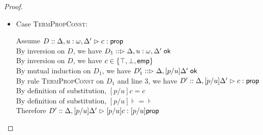 \begin{proof}
\begin{enumerate}
\begin{itemize}
    \item Case \textsc{TermPropConst}:
      \begin{tabbedproof}
        \oo Assume $D :: \judgeA[\Delta, u:\omega, \Delta']{c}{\assert}$ \\
        \ooo By inversion on $D$, we have $D_1 :: \judgeACtx{\Delta, u:\omega, \Delta'}$ \\
        \ooo By inversion on $D$, we have $c \in \setof{\top, \bot, \emp}$ \\
        \ooo By mutual induction on $D_1$, we have $D'_1 :: \judgeACtx{\Delta, [p/u]\Delta'}$ \\
        \ooo By rule \textsc{TermPropConst} on $D_1$ and line 3, we have
            $D' :: \judgeA[{\Delta, [p/u]\Delta'}]{c}{\assert}$ \\
        \ooo By definition of substitution, $[p/u]c = c$ \\
        \ooo By definition of substitution, $[p/u]\assert = \assert$ \\
        \ooo Therefore $D' :: \judgeA[{\Delta, [p/u]\Delta'}]{[p/u]c}{[p/u]\assert}$ \\
      \end{tabbedproof}


\end{itemize}
\end{enumerate}
\end{proof}
